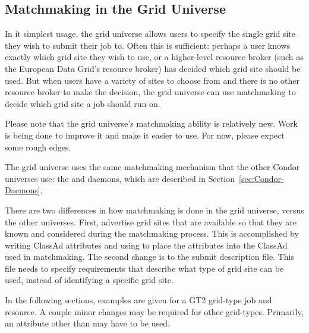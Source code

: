 \subsection{\label{sec:Grid-Matchmaking}Matchmaking in the Grid Universe}

In it simplest usage, the grid universe allows users to specify the single
grid site they wish to submit their job to.
Often this is sufficient: perhaps a user knows exactly which
grid site they wish to use,
or a higher-level resource broker
(such as the European Data Grid's resource broker)
has decided which grid site should be used.
But when users have a variety of sites to choose from and there
is no other resource broker to make the decision, the grid universe can use
matchmaking to decide which grid site a job should run on. 

Please note that the grid universe's matchmaking ability is relatively
new. Work is being done to improve it and make it easier to use. For
now, please expect some rough edges. 

The grid universe uses the same matchmaking mechanism that the other
Condor universes use: the
 and  daemons, which are described in
Section~\ref{sec:Condor-Daemons}. 

There are two differences in how matchmaking is done in the grid
universe, versus the other universes.
First,
advertise grid sites that are available so that they are
known and considered during the matchmaking process.
This is accomplished by writing ClassAd attributes and
using  to place the attributes into the
ClassAd used in matchmaking.
The second change is to the
submit description file.
This file needs to specify requirements that describe what
type of grid site can be used, instead of identifying a specific grid site.


In the following sections, examples are given for a GT2 grid-type job and
resource. A couple minor changes may be required for other grid-types.
Primarily, an attribute other than  may have to be
used.

